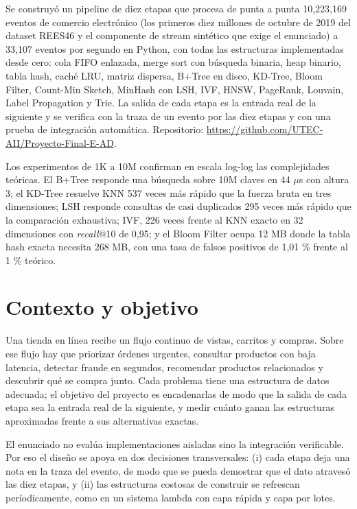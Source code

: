 \documentclass[11pt,letterpaper]{article}
\begin{document}
Se construy\'o un pipeline de diez etapas que procesa de punta a punta 10,223,169 eventos de comercio electr\'onico (los primeros diez millones de octubre de 2019 del dataset REES46 y el componente de stream sint\'etico que exige el enunciado) a 33,107 eventos por segundo en Python, con todas las estructuras implementadas desde cero: cola FIFO enlazada, merge sort con b\'usqueda binaria, heap binario, tabla hash, cach\'e LRU, matriz dispersa, B+Tree en disco, KD-Tree, Bloom Filter, Count-Min Sketch, MinHash con LSH, IVF, HNSW, PageRank, Louvain, Label Propagation y Trie. La salida de cada etapa es la entrada real de la siguiente y se verifica con la traza de un evento por las diez etapas y con una prueba de integraci\'on autom\'atica. Repositorio: \url{https://github.com/UTEC-AII/Proyecto-Final-E-AD}.

Los experimentos de 1K a 10M confirman en escala log-log las complejidades te\'oricas. El B+Tree responde una b\'usqueda sobre 10M claves en 44 $\mu$s con altura 3; el KD-Tree resuelve KNN 537 veces m\'as r\'apido que la fuerza bruta en tres dimensiones; LSH responde consultas de casi duplicados 295 veces m\'as r\'apido que la comparaci\'on exhaustiva; IVF, 226 veces frente al KNN exacto en 32 dimensiones con \emph{recall}@10 de 0,95; y el Bloom Filter ocupa 12 MB donde la tabla hash exacta necesita 268 MB, con una tasa de falsos positivos de 1,01 \% frente al 1 \% te\'orico.


\section{Contexto y objetivo}

Una tienda en l\'inea recibe un flujo continuo de vistas, carritos y compras. Sobre ese flujo hay que priorizar \'ordenes urgentes, consultar productos con baja latencia, detectar fraude en segundos, recomendar productos relacionados y descubrir qu\'e se compra junto. Cada problema tiene una estructura de datos adecuada; el objetivo del proyecto es encadenarlas de modo que la salida de cada etapa sea la entrada real de la siguiente, y medir cu\'anto ganan las estructuras aproximadas frente a sus alternativas exactas.

El enunciado no eval\'ua implementaciones aisladas sino la integraci\'on verificable. Por eso el dise\~no se apoya en dos decisiones transversales: (i) cada etapa deja una nota en la traza del evento, de modo que se pueda demostrar que el dato atraves\'o las diez etapas, y (ii) las estructuras costosas de construir se refrescan per\'iodicamente, como en un sistema lambda con capa r\'apida y capa por lotes.
\end{document}
